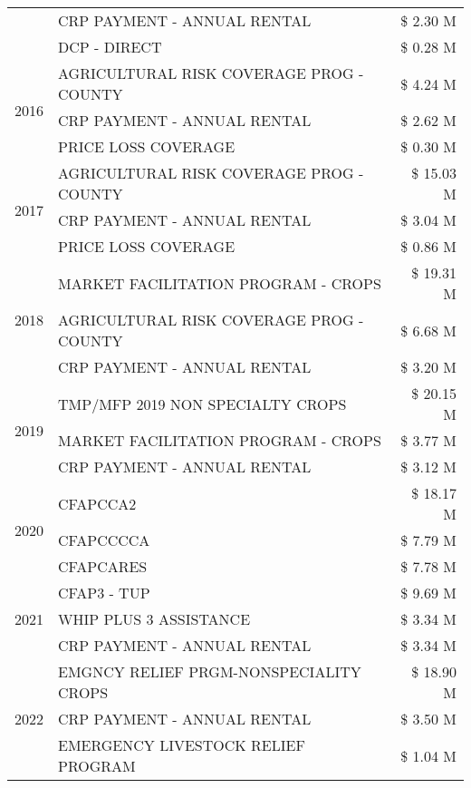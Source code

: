 \begin{tabular}{llr}
 & CRP PAYMENT - ANNUAL RENTAL & \$ 2.30 M \\
 & DCP - DIRECT & \$ 0.28 M \\
\cline{1-3}
\multirow[t]{3}{*}{2016} & AGRICULTURAL RISK COVERAGE PROG - COUNTY & \$ 4.24 M \\
 & CRP PAYMENT - ANNUAL RENTAL & \$ 2.62 M \\
 & PRICE LOSS COVERAGE & \$ 0.30 M \\
\cline{1-3}
\multirow[t]{3}{*}{2017} & AGRICULTURAL RISK COVERAGE PROG - COUNTY & \$ 15.03 M \\
 & CRP PAYMENT - ANNUAL RENTAL & \$ 3.04 M \\
 & PRICE LOSS COVERAGE & \$ 0.86 M \\
\cline{1-3}
\multirow[t]{3}{*}{2018} & MARKET FACILITATION PROGRAM - CROPS & \$ 19.31 M \\
 & AGRICULTURAL RISK COVERAGE PROG - COUNTY & \$ 6.68 M \\
 & CRP PAYMENT - ANNUAL RENTAL & \$ 3.20 M \\
\cline{1-3}
\multirow[t]{3}{*}{2019} & TMP/MFP 2019 NON SPECIALTY CROPS & \$ 20.15 M \\
 & MARKET FACILITATION PROGRAM - CROPS & \$ 3.77 M \\
 & CRP PAYMENT - ANNUAL RENTAL & \$ 3.12 M \\
\cline{1-3}
\multirow[t]{3}{*}{2020} & CFAPCCA2 & \$ 18.17 M \\
 & CFAPCCCCA & \$ 7.79 M \\
 & CFAPCARES & \$ 7.78 M \\
\cline{1-3}
\multirow[t]{3}{*}{2021} & CFAP3 - TUP & \$ 9.69 M \\
 & WHIP PLUS 3 ASSISTANCE & \$ 3.34 M \\
 & CRP PAYMENT - ANNUAL RENTAL & \$ 3.34 M \\
\cline{1-3}
\multirow[t]{3}{*}{2022} & EMGNCY RELIEF PRGM-NONSPECIALITY CROPS & \$ 18.90 M \\
 & CRP PAYMENT - ANNUAL RENTAL & \$ 3.50 M \\
 & EMERGENCY LIVESTOCK RELIEF PROGRAM & \$ 1.04 M \\
\cline{1-3}
\bottomrule
\end{tabular}
